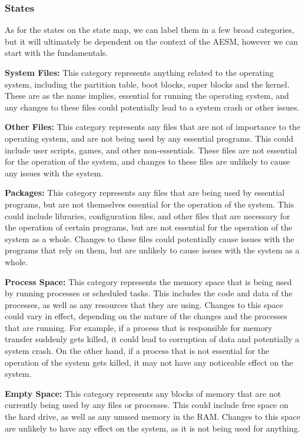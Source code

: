 \subsubsection{States}
\label{States}

As for the states on the state map, we can label them in a few broad categories, but it will ultimately be dependent on the context of the AESM, however we can start with the fundamentals.

\textbf{System Files:} This category represents anything related to the operating system, including the partition table, boot blocks, super blocks and the kernel. These are as the name implies, essential for running the operating system, and any changes to these files could potentially lead to a system crash or other issues.

\textbf{Other Files:} This category represents any files that are not of importance to the operating system, and are not being used by any essential programs. This could include user scripts, games, and other non-essentials. These files are not essential for the operation of the system, and changes to these files are unlikely to cause any issues with the system.

\textbf{Packages:} This category represents any files that are being used by essential programs, but are not themselves essential for the operation of the system. This could include libraries, configuration files, and other files that are necessary for the operation of certain programs, but are not essential for the operation of the system as a whole. Changes to these files could potentially cause issues with the programs that rely on them, but are unlikely to cause issues with the system as a whole.

\textbf{Process Space:} This category represents the memory space that is being used by running processes or scheduled tasks. This includes the code and data of the processes, as well as any resources that they are using. Changes to this space could vary in effect, depending on the nature of the changes and the processes that are running. For example, if a process that is responsible for memory transfer suddenly gets killed, it could lead to corruption of data and potentially a system crash. On the other hand, if a process that is not essential for the operation of the system gets killed, it may not have any noticeable effect on the system.

\textbf{Empty Space:} This category represents any blocks of memory that are not currently being used by any files or processes. This could include free space on the hard drive, as well as any unused memory in the RAM. Changes to this space are unlikely to have any effect on the system, as it is not being used for anything.

